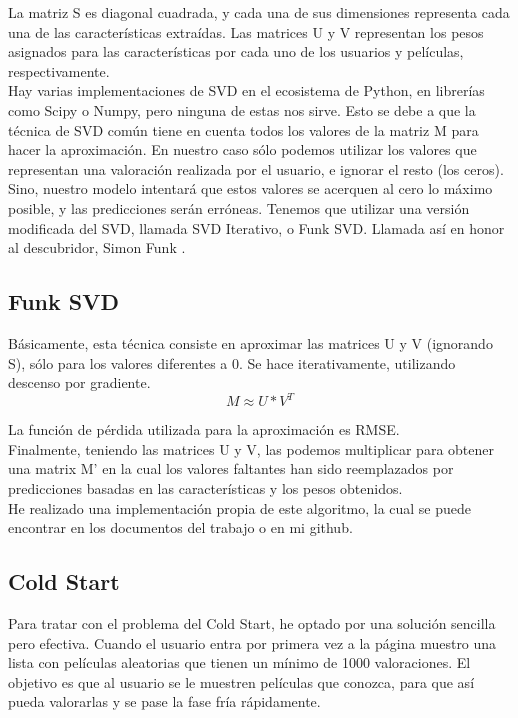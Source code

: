 \documentclass[a4paper, 11pt]{article}
\begin{document}
    		\noindent La matriz S es diagonal cuadrada, y cada una de sus dimensiones representa cada una de las características extraídas. Las matrices U y V representan los pesos asignados para las características por cada uno de los usuarios y películas, respectivamente. \\
    		
    		\noindent Hay varias implementaciones de SVD en el ecosistema de Python, en librerías como Scipy\cite{svd_scipy} o Numpy, pero ninguna de estas nos sirve. Esto se debe a que la técnica de SVD común tiene en cuenta todos los valores de la matriz M para hacer la aproximación. En nuestro caso sólo podemos utilizar los valores que representan una valoración realizada por el usuario, e ignorar el resto (los ceros). Sino, nuestro modelo intentará que estos valores se acerquen al cero lo máximo posible, y las predicciones serán erróneas. Tenemos que utilizar una versión modificada del SVD, llamada SVD Iterativo, o Funk SVD. Llamada así en honor al descubridor, Simon Funk \cite{svd_funk}.
    		
		\subsection{Funk SVD}
    		\noindent Básicamente, esta técnica consiste en aproximar las matrices U y V (ignorando S), sólo para los valores diferentes a 0. Se hace iterativamente, utilizando descenso por gradiente.
		    \begin{equation*}
    			M \approx U * V^T
    		\end{equation*}
    		
    		\noindent La función de pérdida utilizada para la aproximación es RMSE. \\
    		
    		\noindent Finalmente, teniendo las matrices U y V, las podemos multiplicar para obtener una matrix M' en la cual los valores faltantes han sido reemplazados por predicciones basadas en las características y los pesos obtenidos.\\
    		
    		\noindent He realizado una implementación propia de este algoritmo, la cual se puede encontrar en los documentos del trabajo o en mi github\cite{github_svd}.
    		
	     \subsection{Cold Start}
	     	\noindent Para tratar con el problema del Cold Start, he optado por una solución sencilla pero efectiva. Cuando el usuario entra por primera vez a la página muestro una lista con películas aleatorias que tienen un mínimo de 1000 valoraciones. El objetivo es que al usuario se le muestren películas que conozca, para que así pueda valorarlas y se pase la fase fría rápidamente. 
   
\end{document}
